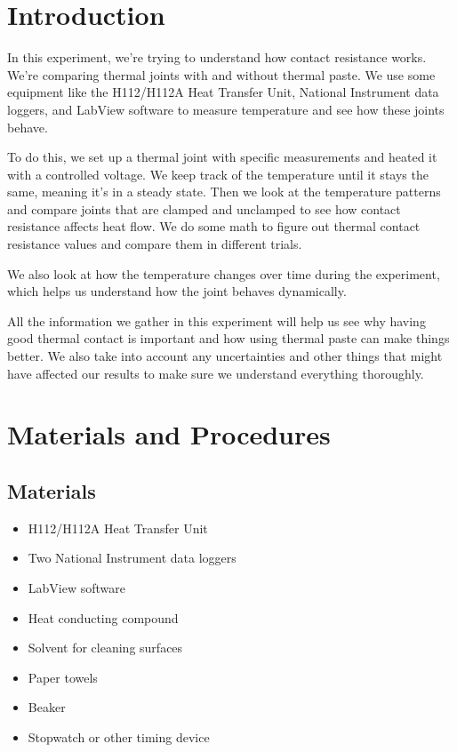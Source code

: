 \documentclass[10pt,twocolumn]{article}
\begin{document}


\section{Introduction} 
\label{sec:introduction}


In this experiment, we're trying to understand how contact resistance works. We're comparing thermal joints with and without thermal paste. We use some equipment like the H112/H112A Heat Transfer Unit, National Instrument data loggers, and LabView software to measure temperature and see how these joints behave.

To do this, we set up a thermal joint with specific measurements and heated it with a controlled voltage. We keep track of the temperature until it stays the same, meaning it's in a steady state. Then we look at the temperature patterns and compare joints that are clamped and unclamped to see how contact resistance affects heat flow. We do some math to figure out thermal contact resistance values and compare them in different trials.

We also look at how the temperature changes over time during the experiment, which helps us understand how the joint behaves dynamically.

All the information we gather in this experiment will help us see why having good thermal contact is important and how using thermal paste can make things better. We also take into account any uncertainties and other things that might have affected our results to make sure we understand everything thoroughly.
\section{Materials and Procedures}
\label{sec:MatandProcedures}

\subsection{Materials}
\label{Materials}


\begin{itemize}
    \item H112/H112A Heat Transfer Unit
    \item Two National Instrument data loggers
    \item LabView software
    \item Heat conducting compound
    \item Solvent for cleaning surfaces
    \item Paper towels
    \item Beaker
    \item Stopwatch or other timing device
\end{itemize}
\end{document}
